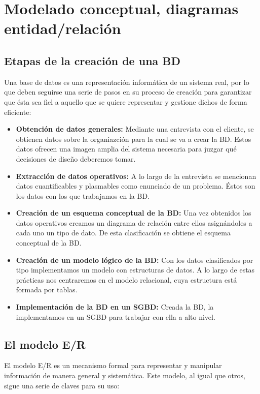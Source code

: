 \chapter{Modelado conceptual, diagramas entidad/relación}

\section{Etapas de la creación de una BD}

Una base de datos es una representación informática de un sistema real, por lo que deben seguirse una serie de pasos en su proceso de creación para garantizar que ésta sea fiel a aquello que se quiere representar y gestione dichos de forma eficiente:

\begin{itemize}
	\item\textbf{Obtención de datos generales:} Mediante una entrevista con el cliente, se obtienen datos sobre la organiazción para la cual se va a crear la BD\@. Estos datos ofrecen una imagen amplia del sistema necesaria para juzgar qué decisiones de diseño deberemos tomar.
	\item\textbf{Extracción de datos operativos:} A lo largo de la entrevista se mencionan datos cuantificables y plasmables como enunciado de un problema. Éstos son los datos con los que trabajamos en la BD\@.
	\item\textbf{Creación de un esquema conceptual de la BD:} Una vez obtenidos los datos operativos creamos un diagrama de relación entre ellos asignándoles a cada uno un tipo de dato. De esta clasificación se obtiene el esquema conceptual de la BD\@.
	\item\textbf{Creación de un modelo lógico de la BD:} Con los datos clasificados por tipo implementamos un modelo con estructuras de datos. A lo largo de estas prácticas nos centraremos en el modelo relacional, cuya estructura está formada por tablas.
	\item\textbf{Implementación de la BD en un SGBD:} Creada la BD, la implementamos en un SGBD para trabajar con ella a alto nivel.
\end{itemize}

\section{El modelo E/R}

El modelo E/R es un mecanismo formal para representar y manipular información de manera general y sistemática.
Este modelo, al igual que otros, sigue una serie de claves para su uso:

